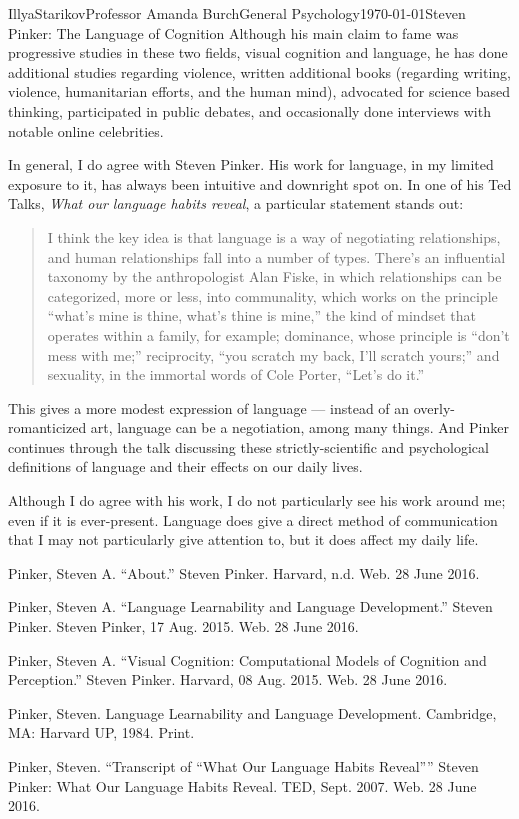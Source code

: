 \documentclass[12pt,letterpaper]{article}
\begin{document}
\begin{mla}{Illya}{Starikov}{Professor Amanda Burch}{General Psychology}{\today}{Steven Pinker: The Language of Cognition}
Although his main claim to fame was progressive studies in these two fields, visual cognition and language, he has done additional studies regarding violence, written additional books (regarding writing, violence, humanitarian efforts, and the human mind), advocated for science based thinking, participated in public debates, and occasionally done interviews with notable online celebrities.

In general, I do agree with Steven Pinker. His work for language, in my limited exposure to it, has always been intuitive and downright spot on. In one of his Ted Talks, \textit{What our language habits reveal}, a particular statement stands out:

\begin{quote}
I think the key idea is that language is a way of negotiating relationships, and human relationships fall into a number of types. There's an influential taxonomy by the anthropologist Alan Fiske, in which relationships can be categorized, more or less, into communality, which works on the principle ``what's mine is thine, what's thine is mine,'' the kind of mindset that operates within a family, for example; dominance, whose principle is ``don't mess with me;'' reciprocity, ``you scratch my back, I'll scratch yours;'' and sexuality, in the immortal words of Cole Porter, ``Let's do it.''\
\end{quote}

\noindent This gives a more modest expression of language --- instead of an overly-romanticized art, language can be a negotiation, among many things. And Pinker continues through the talk discussing these strictly-scientific and psychological definitions of language and their effects on our daily lives.

Although I do agree with his work, I do not particularly see his work around me; even if it is ever-present. Language does give a direct method of communication that I may not particularly give attention to, but it does affect my daily life.

\begin{workscited}
\bibent

Pinker, Steven A. ``About.'' Steven Pinker. Harvard, n.d. Web. 28 June 2016.

Pinker, Steven A. ``Language Learnability and Language Development.'' Steven Pinker. Steven Pinker, 17 Aug. 2015. Web. 28 June 2016.

Pinker, Steven A. ``Visual Cognition: Computational Models of Cognition and Perception.'' Steven Pinker. Harvard, 08 Aug. 2015. Web. 28 June 2016.

Pinker, Steven. Language Learnability and Language Development. Cambridge, MA: Harvard UP, 1984. Print.

Pinker, Steven. ``Transcript of ``What Our Language Habits Reveal'''' Steven Pinker: What Our Language Habits Reveal. TED, Sept. 2007. Web. 28 June 2016.
\end{workscited}

\end{mla}
\end{document}
